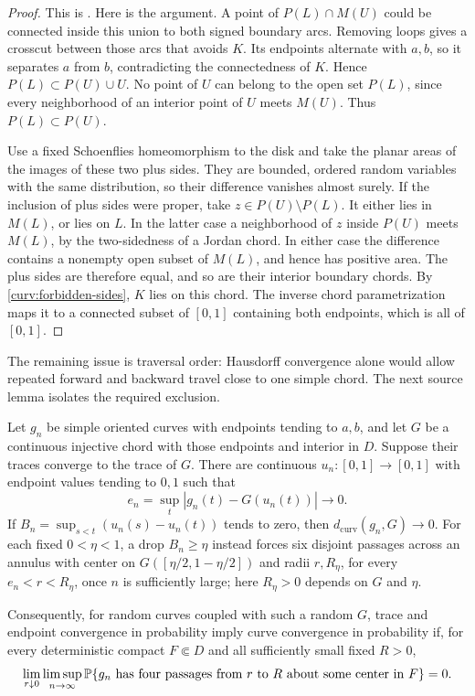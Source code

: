 \begin{proof}
This is \cite[Section~7, Lemma ``Ordered chords with equal laws'']{S}.
Here is the argument.  A point of $P(L)\cap M(U)$ could be connected
inside this union to both signed boundary arcs.  Removing loops gives
a crosscut between those arcs that avoids $K$.  Its endpoints
alternate with $a,b$, so it separates $a$ from $b$, contradicting the
connectedness of $K$.  Hence $P(L)\subset P(U)\cup U$.  No point of
$U$ can belong to the open set $P(L)$, since every neighborhood of an
interior point of $U$ meets $M(U)$.  Thus $P(L)\subset P(U)$.

Use a fixed Schoenflies homeomorphism to the disk and take the planar
areas of the images of these two plus sides.  They are bounded, ordered
random variables with the same distribution, so their difference
vanishes almost surely.  If the inclusion of plus sides were proper,
take $z\in P(U)\setminus P(L)$.  It either lies in $M(L)$, or lies on $L$.
In the latter case a neighborhood of $z$ inside $P(U)$ meets $M(L)$,
by the two-sidedness of a Jordan chord.  In either case the difference
contains a nonempty open subset of $M(L)$, and hence has positive area.
The plus sides are therefore equal, and so are their interior boundary
chords.  By \eqref{curv:forbidden-sides}, $K$ lies on this chord.  The
inverse chord parametrization maps it to a connected subset of $[0,1]$
containing both endpoints, which is all of $[0,1]$.
\end{proof}

The remaining issue is traversal order: Hausdorff convergence alone
would allow repeated forward and backward travel close to one simple
chord.  The next source lemma isolates the required exclusion.

\begin{lemma}
\label{curv:progress}
Let $g_n$ be simple oriented curves with endpoints tending to $a,b$,
and let $G$ be a continuous injective chord with those endpoints and
interior in $D$.  Suppose their traces converge to the trace of $G$.
There are continuous $u_n:[0,1]\to[0,1]$ with endpoint values tending
to $0,1$ such that
\[
 e_n=\sup_t|g_n(t)-G(u_n(t))|\longrightarrow0.
\]
If $B_n=\sup_{s<t}(u_n(s)-u_n(t))$ tends to zero, then
$d_{\mathrm{curv}}(g_n,G)\to0$.  For each fixed $0<\eta<1$, a drop
$B_n\ge\eta$ instead forces six disjoint passages across an annulus
with center on $G([\eta/2,1-\eta/2])$ and radii $r,R_\eta$, for every
$e_n<r<R_\eta$, once $n$ is sufficiently large; here $R_\eta>0$
depends on $G$ and $\eta$.

Consequently, for random curves coupled with such a random $G$, trace
and endpoint convergence in probability imply curve convergence in
probability if, for every deterministic compact $F\Subset D$ and all
sufficiently small fixed $R>0$,
\begin{equation}
 \lim_{r\downarrow0}\limsup_{n\to\infty}
 \mathbb P\{\text{$g_n$ has four passages from $r$ to $R$
                  about some center in $F$}\}=0.
 \label{curv:passage-criterion}
\end{equation}
\end{lemma}


